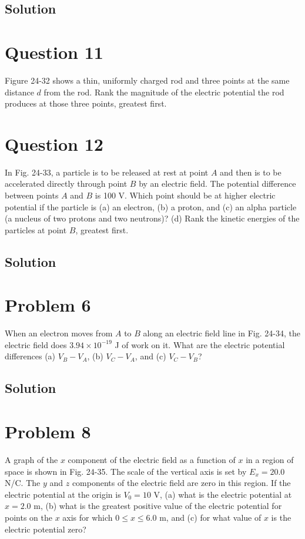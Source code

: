 \documentclass{article}
\begin{document}
\subsection*{Solution}

\section*{Question 11}
Figure 24-32 shows a thin, uniformly charged rod and three points at the same distance $d$ from the rod. Rank the magnitude of the electric potential the rod produces at those three points, greatest first.

\section*{Question 12}
In Fig. 24-33, a particle is to be released at rest at point $A$ and then is to be accelerated directly through point $B$ by an electric field. The potential difference between points $A$ and $B$ is 100 V. Which point should be at higher electric potential if the particle is (a) an electron, (b) a proton, and (c) an alpha particle (a nucleus of two protons and two neutrons)? (d) Rank the kinetic energies of the particles at point $B$, greatest first.

\subsection*{Solution}

\section*{Problem 6}
When an electron moves from $A$ to $B$ along an electric field line in Fig. 24-34, the electric field does $3.94 \times 10^{-19}$ J of work on it. What are the electric potential differences (a) $V_B - V_A$, (b) $V_C - V_A$, and (c) $V_C - V_B$?

\subsection*{Solution}

\section*{Problem 8}
A graph of the $x$ component of the electric field as a function of $x$ in a region of space is shown in Fig. 24-35. The scale of the vertical axis is set by $E_x = 20.0$ N/C. The $y$ and $z$ components of the electric field are zero in this region. If the electric potential at the origin is $V_0 = 10$ V, (a) what is the electric potential at $x = 2.0$ m, (b) what is the greatest positive value of the electric potential for points on the $x$ axis for which $0 \leq x \leq 6.0$ m, and (c) for what value of $x$ is the electric potential zero?
\end{document}
